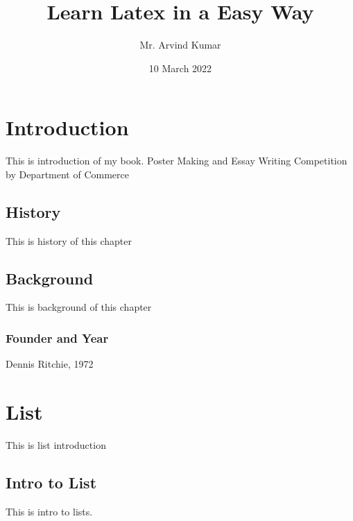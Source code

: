 \documentclass{book}
\begin{document}
	
	\title{Learn Latex in a Easy Way}
	\author{Mr. Arvind Kumar}
	\date{10 March 2022}
	\maketitle
	\tableofcontents
	\newpage
	\chapter{Introduction}
		This is introduction of my book. Poster Making and Essay Writing Competition by Department of Commerce 
		\section{History}
			This is history of this chapter
		\section{Background}
		This is background of this chapter
			\subsection{Founder and Year}
		Dennis Ritchie, 1972
	\chapter{List}
		This is list introduction
		\section{Intro to List}
			This is intro to lists.
\end{document}
